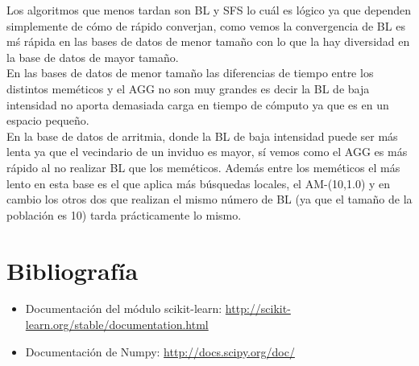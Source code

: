 \documentclass[10pt,a4paper]{article}
\begin{document}
Los algoritmos que menos tardan son BL y SFS lo cuál es lógico ya que dependen simplemente de cómo de rápido converjan, como vemos la convergencia de BL es mś rápida en las bases de datos de menor tamaño con lo que la hay diversidad en la base de datos de mayor tamaño.\\

En las bases de datos de menor tamaño las diferencias de tiempo entre los distintos meméticos y el AGG no son muy grandes es decir la BL de baja intensidad no aporta demasiada carga en tiempo de cómputo ya que es en un espacio pequeño.\\

En la base de datos de arritmia, donde la BL de baja intensidad puede ser más lenta ya que el vecindario de un inviduo es mayor, sí vemos como el AGG es más rápido al no realizar BL que los meméticos. Además entre los meméticos el más lento en esta base es el que aplica más búsquedas locales, el AM-(10,1.0) y en cambio los otros dos que realizan el mismo número de BL (ya que el tamaño de la población es 10) tarda prácticamente lo mismo.\\

\newpage
\section{\color[rgb]{0.0,0.0,0.21}Bibliografía}

\begin{itemize}
\item Documentación del módulo scikit-learn: \url{http://scikit-learn.org/stable/documentation.html}
\item Documentación de Numpy: \url{http://docs.scipy.org/doc/}
\end{itemize}
\end{document}
